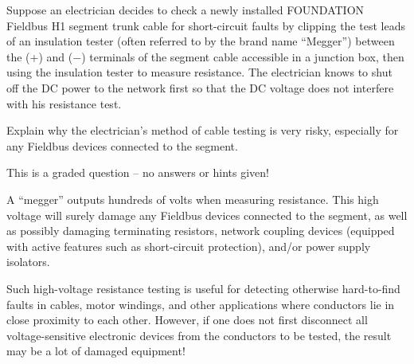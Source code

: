 

Suppose an electrician decides to check a newly installed FOUNDATION Fieldbus H1 segment trunk cable for short-circuit faults by clipping the test leads of an insulation tester (often referred to by the brand name ``Megger'') between the (+) and ($-$) terminals of the segment cable accessible in a junction box, then using the insulation tester to measure resistance.  The electrician knows to shut off the DC power to the network first so that the DC voltage does not interfere with his resistance test.

\vskip 10pt

Explain why the electrician's method of cable testing is very risky, especially for any Fieldbus devices connected to the segment.

\vfil

\eject






This is a graded question -- no answers or hints given!







A ``megger'' outputs hundreds of volts when measuring resistance.  This high voltage will surely damage any Fieldbus devices connected to the segment, as well as possibly damaging terminating resistors, network coupling devices (equipped with active features such as short-circuit protection), and/or power supply isolators.

Such high-voltage resistance testing is useful for detecting otherwise hard-to-find faults in cables, motor windings, and other applications where conductors lie in close proximity to each other.  However, if one does not first disconnect all voltage-sensitive electronic devices from the conductors to be tested, the result may be a lot of damaged equipment!




